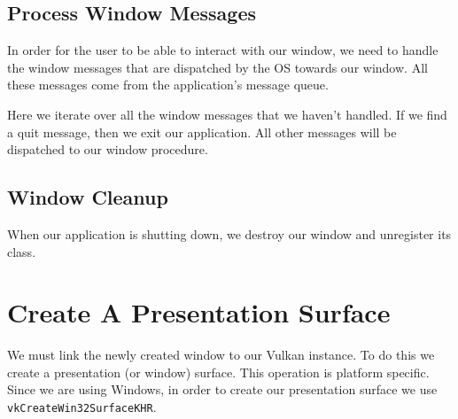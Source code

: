 \begin{minipage}{\linewidth}{\noindent}
    
\end{minipage}

\subsection{Process Window Messages}

In order for the user to be able to interact with our window, we need to handle
the window messages that are dispatched by the OS towards our window.
All these messages come from the application's message queue.

\begin{minipage}{\linewidth}{\noindent}
    
\end{minipage}

Here we iterate over all the window messages that we haven't handled.
If we find a quit message, then we exit our application.
All other messages will be dispatched to our window procedure.

\subsection{Window Cleanup}

When our application is shutting down, we destroy our window and unregister
its class.

\begin{minipage}{\linewidth}{\noindent}
    
\end{minipage}

\section{Create A Presentation Surface}

We must link the newly created window to our Vulkan instance.
To do this we create a presentation (or window) surface.
This operation is platform specific.
Since we are using Windows, in order to create our presentation surface we
use \texttt{vkCreateWin32SurfaceKHR}.


